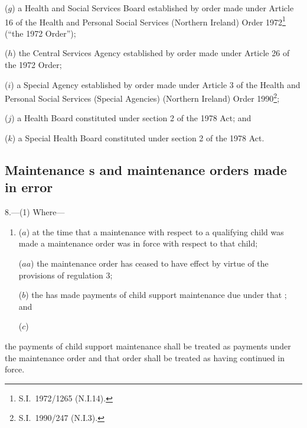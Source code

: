 \documentclass[12pt,a4paper]{article}
\begin{document}
\begin{enumerate}
($g$) a Health and Social Services Board established by order made under Article 16 of the Health and Personal Social Services (Northern Ireland) Order 1972\footnote{S.I.\ 1972/1265 (N.I.14).} (“the 1972 Order”);

($h$) the Central Services Agency established by order made under Article 26 of the 1972 Order;

($i$) a Special Agency established by order made under Article 3 of the Health and Personal Social Services (Special Agencies) (Northern Ireland) Order 1990\footnote{S.I.\ 1990/247 (N.I.3).};

($j$) a Health Board constituted under section 2 of the 1978 Act; and

($k$) a Special Health Board constituted under section 2 of the 1978 Act.
\end{enumerate}


\subsection[8. Maintenance \opt{oldrules}{assessment}\opt{newrules}{calculation}s and maintenance orders made in error]{Maintenance s and maintenance orders made in error}

8.—(1) Where—
\begin{enumerate}\item[]
($a$) at the time that a maintenance  with respect to a qualifying child was made a maintenance order was in force with respect to that child;

($aa$) the maintenance order has ceased to have effect by virtue of the provisions of regulation 3;

($b$) the  has made payments of child support maintenance due under that ; and

($c$) 
%
\end{enumerate}
the payments of child support maintenance shall be treated as payments under the maintenance order and that order shall be treated as having continued in force.
\end{document}
